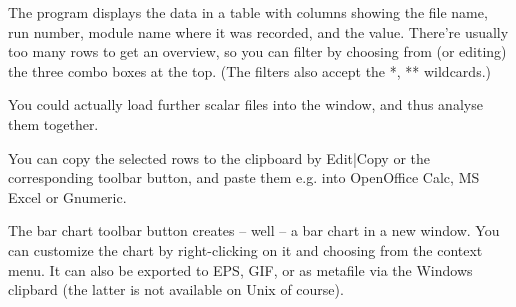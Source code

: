 The program displays the data in a table with columns showing the
file name, run number, module name where it was recorded, and the value.
There're usually too many rows to get an overview, so you can filter
by choosing from (or editing) the three combo boxes at the top.
(The filters also accept the *, ** wildcards.)

You could actually load further scalar files into the window,
and thus analyse them together.

You can copy the selected rows to the clipboard by Edit|Copy or
the corresponding toolbar button, and paste them e.g. into
OpenOffice Calc, MS Excel or Gnumeric.

The bar chart toolbar button creates -- well -- a bar chart
in a new window. You can customize the chart by right-clicking
on it and choosing from the context menu. It can also be exported
to EPS, GIF, or as metafile via the Windows clipbard (the latter
is not available on Unix of course).




